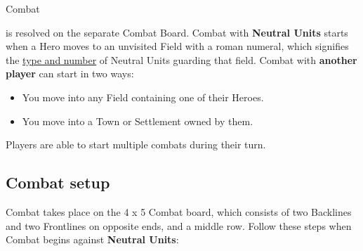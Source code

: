 \hypertarget{Combat}{Combat} is resolved on the separate Combat Board.
Combat with \textbf{Neutral Units} starts when a Hero moves to an unvisited Field with a roman numeral, which signifies the \hyperlink{Difficulty}{type and number} of Neutral Units guarding that field.
Combat with \textbf{another player} can start in two ways:
\begin{itemize}
  \item You move into any Field containing one of their Heroes.
  \item You move into a Town or Settlement owned by them.
\end{itemize}
Players are able to start multiple combats during their turn.

\subsection*{\hypertarget{Combatsetup}{Combat setup}}

Combat takes place on the 4 x 5 Combat board, which consists of two Backlines and two Frontlines on opposite ends, and a middle row.
Follow these steps when Combat begins against \textbf{Neutral Units}:


